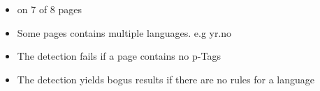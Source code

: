 \begin{frame}[c]
	\begin{itemize}
      \begin{itemize}
      	\item on 7 of 8 pages
	  \end{itemize}
      
      \begin{itemize}
      	\item Some pages contains multiple languages. e.g yr.no
      	\item The detection fails if a page contains no p-Tags
      	\item The detection yields bogus results if there are no rules for a
      language
	  \end{itemize}
    \end{itemize}
\end{frame}

